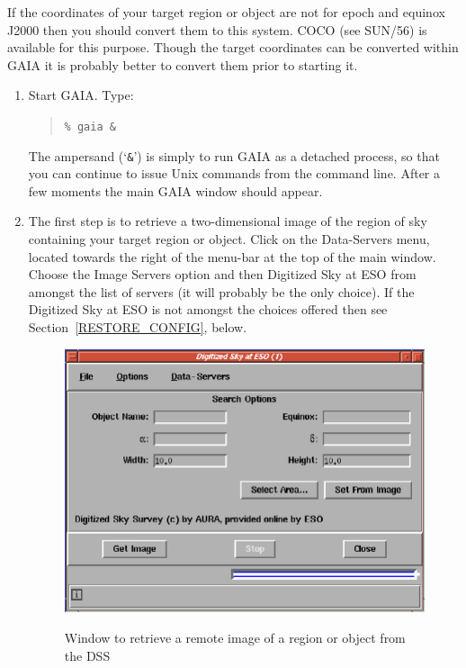 \documentclass[twoside,11pt]{article}
\begin{document}
If the coordinates of your target region or object are not for epoch and
equinox J2000 then you should convert them to this system.  COCO (see
SUN/56\cite{SUN56}) is available for this purpose.  Though the target
coordinates can be converted within GAIA it is probably better to convert
them prior to starting it.

\begin{enumerate}

  \item Start GAIA.  Type:

  \begin{quote}
   {\tt \%  gaia \&}
  \end{quote}

   The ampersand (`{\tt \&}') is simply to run GAIA as a detached process,
   so that you can continue to issue Unix commands from the command line.
   After a few moments the main GAIA window should appear.

  \item The first step is to retrieve a two-dimensional image of the
   region of sky containing your target region or object.  Click on the
   {\sf Data-Servers} menu, located towards the right of the menu-bar at
   the top of the main window.  Choose the {\sf Image Servers} option and
   then {\sf Digitized Sky at ESO} from amongst the list of servers (it
   will probably be the only choice).  If the {\sf Digitized Sky at ESO}
   is not amongst the choices offered then see
   Section~\ref{RESTORE_CONFIG}, below.

  \begin{figure}[htbp]
     \centering
     \includegraphics[totalheight=3in]{sc17_retriev_r_dss.ps}
     \begin{quote}
     \caption[Window to retrieve a remote image]
      {Window to retrieve a remote image of a region or object from the
      DSS
     \label{RETRIEV_R_DSS} }
     \end{quote}
  \end{figure}


\end{enumerate}
\end{document}
